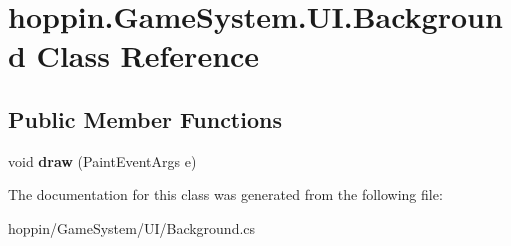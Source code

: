 \hypertarget{classhoppin_1_1_game_system_1_1_u_i_1_1_background}{}\section{hoppin.\+Game\+System.\+U\+I.\+Background Class Reference}
\label{classhoppin_1_1_game_system_1_1_u_i_1_1_background}
\subsection*{Public Member Functions}
\begin{DoxyCompactItemize}
\item 
void {\bfseries draw} (Paint\+Event\+Args e)\hypertarget{classhoppin_1_1_game_system_1_1_u_i_1_1_background_ac3184f74ee57490c21ea6a3dab447608}{}\label{classhoppin_1_1_game_system_1_1_u_i_1_1_background_ac3184f74ee57490c21ea6a3dab447608}

\end{DoxyCompactItemize}


The documentation for this class was generated from the following file\+:\begin{DoxyCompactItemize}
\item 
hoppin/\+Game\+System/\+U\+I/Background.\+cs\end{DoxyCompactItemize}
